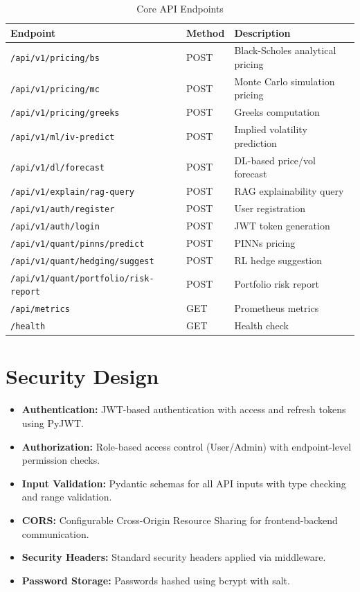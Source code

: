 \documentclass[12pt,a4paper]{report}
\begin{document}
\begin{table}[H]
\centering
\caption{Core API Endpoints}
\label{tab:api-endpoints}
\begin{tabularx}{\textwidth}{|l|l|X|}
\hline
\textbf{Endpoint} & \textbf{Method} & \textbf{Description} \\
\hline
\texttt{/api/v1/pricing/bs} & POST & Black-Scholes analytical pricing \\
\hline
\texttt{/api/v1/pricing/mc} & POST & Monte Carlo simulation pricing \\
\hline
\texttt{/api/v1/pricing/greeks} & POST & Greeks computation \\
\hline
\texttt{/api/v1/ml/iv-predict} & POST & Implied volatility prediction \\
\hline
\texttt{/api/v1/dl/forecast} & POST & DL-based price/vol forecast \\
\hline
\texttt{/api/v1/explain/rag-query} & POST & RAG explainability query \\
\hline
\texttt{/api/v1/auth/register} & POST & User registration \\
\hline
\texttt{/api/v1/auth/login} & POST & JWT token generation \\
\hline
\texttt{/api/v1/quant/pinns/predict} & POST & PINNs pricing \\
\hline
\texttt{/api/v1/quant/hedging/suggest} & POST & RL hedge suggestion \\
\hline
\texttt{/api/v1/quant/portfolio/risk-report} & POST & Portfolio risk report \\
\hline
\texttt{/api/metrics} & GET & Prometheus metrics \\
\hline
\texttt{/health} & GET & Health check \\
\hline
\end{tabularx}
\end{table}

\section{Security Design}

\begin{itemize}
    \item \textbf{Authentication:} JWT-based authentication with access and refresh tokens using PyJWT.
    \item \textbf{Authorization:} Role-based access control (User/Admin) with endpoint-level permission checks.
    \item \textbf{Input Validation:} Pydantic schemas for all API inputs with type checking and range validation.
    \item \textbf{CORS:} Configurable Cross-Origin Resource Sharing for frontend-backend communication.
    \item \textbf{Security Headers:} Standard security headers applied via middleware.
    \item \textbf{Password Storage:} Passwords hashed using bcrypt with salt.
\end{itemize}
\end{document}

